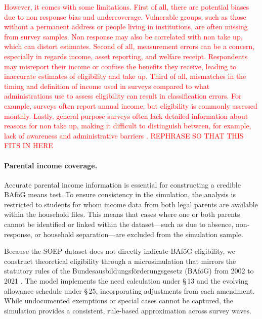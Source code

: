 \textcolor{red}{However, it comes with some limitations. First of all, there are potential biases due to non response bias and undercoverage. Vulnerable groups, such as those without a permanent address or people living in institutions, are often missing from survey samples. Non response may also be correlated with non take up, which can distort estimates. Second of all, measurement errors can be a concern, especially in regards income, asset reporting, and welfare receipt. Respondents may misreport their income or confuse the benefits they receive, leading to inaccurate estimates of eligibility and take up. Third of all, mismatches in the timing and definition of income used in surveys compared to what administrations use to assess eligibility can result in classification errors. For example, surveys often report annual income, but eligibility is commonly assessed monthly. Lastly, general purpose surveys often lack detailed information about reasons for non take up, making it difficult to distinguish between, for example, lack of awareness and administrative barriers \citep{mechelen_who_2017}. REPHRASE SO THAT THIS FITS IN HERE}

\paragraph{Parental income coverage.} %
Accurate parental income information is essential for constructing a credible BAföG means test. 
To ensure consistency in the simulation, the analysis is restricted to students for whom income data from both legal parents are available within the household files. 
This means that cases where one or both parents cannot be identified or linked within the dataset—such as due to absence, non-response, or household separation—are excluded from the simulation sample.

Because the SOEP dataset does not directly indicate BAföG eligibility, we construct theoretical eligibility through a microsimulation that mirrors the statutory rules of the Bundesausbildungsförderungsgesetz (BAföG) from 2002 to 2021 \citep{bafoeg_law,bafoeg20,bafoeg21,bafoeg22,bafoeg23,bafoeg24,bafoeg25,bafoeg26,bafoeg27,bafoeg28,bafoeg29}. 
The model implements the need calculation under §\,13 and the evolving allowance schedule under §\,25, incorporating adjustments from each amendment. 
While undocumented exemptions or special cases cannot be captured, the simulation provides a consistent, rule-based approximation across survey waves.

